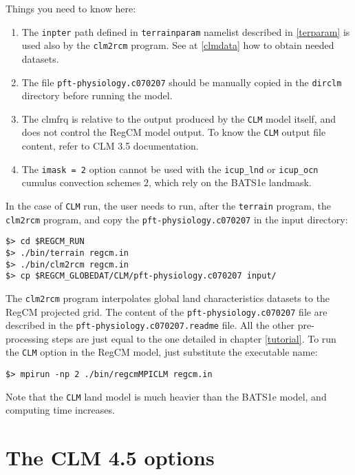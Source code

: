 Things you need to know here:

\begin{enumerate}
\item The \verb=inpter= path defined in \verb=terrainparam= namelist
described in \ref{terparam} is used also by the \verb=clm2rcm= program.
See at \ref{clmdata} how to obtain needed datasets.
\item The file \verb=pft-physiology.c070207= should be manually copied in the
\verb=dirclm= directory before running the model.
\item The clmfrq is relative to the output produced by the \verb=CLM= model
itself, and does not control the RegCM model output. To know the \verb=CLM=
output file content, refer to CLM 3.5 documentation.
\item The \verb'imask = 2' option cannot be used with the \verb'icup_lnd' or
\verb'icup_ocn' cumulus convection schemes $2$, which rely on the BATS1e
landmask.
\end{enumerate}

In the case of \verb=CLM= run, the user needs to run, after the \verb=terrain=
program, the \verb=clm2rcm= program, and copy the \verb=pft-physiology.c070207=
in the input directory:

\begin{Verbatim}
$> cd $REGCM_RUN
$> ./bin/terrain regcm.in
$> ./bin/clm2rcm regcm.in
$> cp $REGCM_GLOBEDAT/CLM/pft-physiology.c070207 input/
\end{Verbatim}

The \verb=clm2rcm= program interpolates global land characteristics datasets
to the RegCM projected grid. The content of the \verb=pft-physiology.c070207=
file are described in the \verb=pft-physiology.c070207.readme= file.
All the other pre-processing steps are just equal to the one detailed in
chapter \ref{tutorial}. To run the \verb=CLM= option in the RegCM model, just
substitute the executable name:

\begin{Verbatim}
$> mpirun -np 2 ./bin/regcmMPICLM regcm.in
\end{Verbatim}

Note that the \verb=CLM= land model is much heavier than the BATS1e model, and
computing time increases.

\section{The CLM 4.5 options}
\label{clm45}

